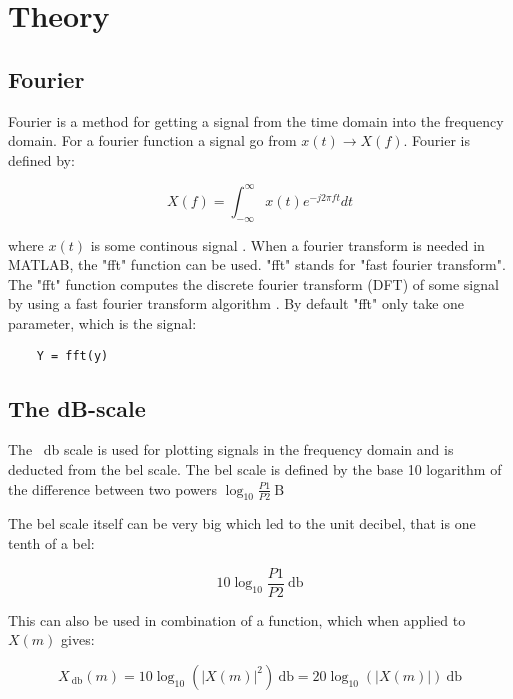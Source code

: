 \section{Theory}

\subsection{Fourier}

Fourier is a method for getting a signal from the time domain into the frequency domain. For a fourier function a signal go from $x(t) \rightarrow X(f)$. Fourier is defined by:

\begin{equation}
X(f) = \int_{-\infty}^{\infty} x(t)e^{-j2\pi ft}dt
\end{equation}

where $x(t)$ is some continous signal \cite[p. 53]{DSP}. When a fourier transform is needed in MATLAB, the "fft" function can be used. "fft" stands for "fast fourier transform". The "fft" function computes the discrete fourier transform (DFT) of some signal by using a fast fourier transform algorithm \cite[fft]{MATLAB_DOC}. By default "fft" only take one parameter, which is the signal:

\begin{verbatim}
	Y = fft(y)
\end{verbatim}

\subsection{The dB-scale}

The \SI{}{\decibel} scale is used for plotting signals in the frequency domain and is deducted from the bel scale. The bel scale is defined by the base 10 logarithm of the difference between two powers $\log_{10}\frac{P1}{P2}\SI{}{\bel}$

The bel scale itself can be very big which led to the unit decibel, that is one tenth of a bel:

\begin{equation}
10\log_{10}\frac{P1}{P2}\SI{}{\decibel}
\end{equation}

This can also be used in combination of a function, which when applied to $X(m)$ gives:

\begin{equation}
X_{\SI{}{\decibel}}(m) = 10\log_{10}(|X(m)|^2)\SI{}{\decibel} = 20\log_{10}(|X(m)|)\SI{}{\decibel}
\end{equation}

